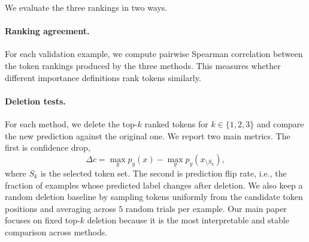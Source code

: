 We evaluate the three rankings in two ways.

\paragraph{Ranking agreement.}
For each validation example, we compute pairwise Spearman correlation between the token rankings produced by the three methods. This measures whether different importance definitions rank tokens similarly.

\paragraph{Deletion tests.}
For each method, we delete the top-$k$ ranked tokens for $k \in \{1,2,3\}$ and compare the new prediction against the original one. We report two main metrics. The first is confidence drop,
\begin{equation}
\Delta c = \max_y p_y(x) - \max_y p_y(x_{\setminus S_k}),
\end{equation}
where $S_k$ is the selected token set. The second is prediction flip rate, i.e., the fraction of examples whose predicted label changes after deletion. We also keep a random deletion baseline by sampling tokens uniformly from the candidate token positions and averaging across $5$ random trials per example. Our main paper focuses on fixed top-$k$ deletion because it is the most interpretable and stable comparison across methods.
